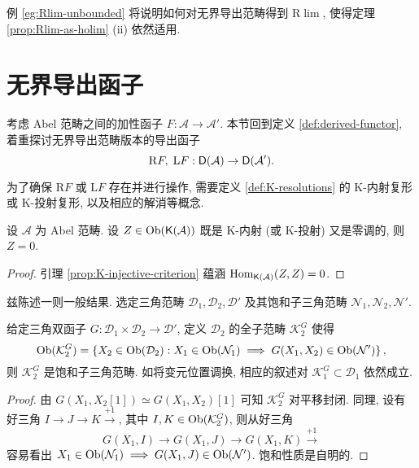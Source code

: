 例 \ref{eg:Rlim-unbounded} 将说明如何对无界导出范畴得到 $\mathrm{R}\lim$, 使得定理 \ref{prop:Rlim-as-holim} (ii) 依然适用.

\section{无界导出函子}\label{sec:unbounded-derived}
考虑 Abel 范畴之间的加性函子 $F: \mathcal{A} \to \mathcal{A}'$. 本节回到定义 \ref{def:derived-functor}, 着重探讨无界导出范畴版本的导出函子
\[ \mathrm{R}F, \; \mathrm{L}F: \mathsf{D}(\mathcal{A}) \to \mathsf{D}(\mathcal{A}'). \]

为了确保 $\mathrm{R}F$ 或 $\mathrm{L}F$ 存在并进行操作, 需要定义 \ref{def:K-resolutions} 的 K-内射复形或 K-投射复形, 以及相应的解消等概念.

\begin{lemma}\label{prop:K-injective-zero}
	设 $\mathcal{A}$ 为 Abel 范畴. 设 $Z \in \operatorname{Ob}(\mathsf{K}(\mathcal{A}))$ 既是 K-内射 (或 K-投射) 又是零调的, 则 $Z = 0$.
\end{lemma}
\begin{proof}
	引理 \ref{prop:K-injective-criterion} 蕴涵 $\operatorname{Hom}_{\mathsf{K}(\mathcal{A})}(Z, Z) = 0$.
\end{proof}

兹陈述一则一般结果. 选定三角范畴 $\mathcal{D}_1, \mathcal{D}_2, \mathcal{D}'$ 及其饱和子三角范畴 $\mathcal{N}_1, \mathcal{N}_2, \mathcal{N}'$.

\begin{lemma}\label{prop:K-cats}
	给定三角双函子 $G: \mathcal{D}_1 \times \mathcal{D}_2 \to \mathcal{D}'$, 定义 $\mathcal{D}_2$ 的全子范畴 $\mathcal{K}_2^G$ 使得
	\[ \operatorname{Ob}(\mathcal{K}_2^G) = \left\{ X_2 \in \operatorname{Ob}(\mathcal{D}_2) : X_1 \in \operatorname{Ob}(\mathcal{N}_1) \implies G(X_1, X_2) \in \operatorname{Ob}(\mathcal{N}') \right\}, \]
	则 $\mathcal{K}_2^G$ 是饱和子三角范畴. 如将变元位置调换, 相应的叙述对 $\mathcal{K}_1^G \subset \mathcal{D}_1$ 依然成立.
\end{lemma}
\begin{proof}
	由 $G(X_1, X_2[1]) \simeq G(X_1, X_2)[1]$ 可知 $\mathcal{K}_2^G$ 对平移封闭. 同理, 设有好三角 $I \to J \to K \xrightarrow{+1}$, 其中 $I, K \in \operatorname{Ob}(\mathcal{K}_2^G)$, 则从好三角
	\[ G(X_1, I) \to G(X_1, J) \to G(X_1, K) \xrightarrow{+1} \]
	容易看出 $X_1 \in \operatorname{Ob}(\mathcal{N}_1) \implies G(X_1, J) \in \operatorname{Ob}(\mathcal{N}')$. 饱和性质是自明的.
\end{proof}

